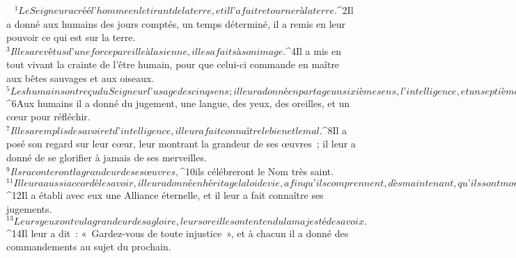          
      \bchapter{}
        ${}^{1}Le Seigneur a créé l’homme en le tirant de la terre,
        et il l’a fait retourner à la terre.
        ${}^{2}Il a donné aux humains des jours comptés, un temps déterminé,
        il a remis en leur pouvoir ce qui est sur la terre.
        ${}^{3}Il les a revêtus d’une force pareille à la sienne,
        il les a faits à son image.
        ${}^{4}Il a mis en tout vivant la crainte de l’être humain,
        pour que celui-ci commande en maître
        aux bêtes sauvages et aux oiseaux.
        ${}^{5}Les humains ont reçu du Seigneur l’usage des cinq sens ;
        il leur a donné en partage un sixième sens, l’intelligence,
        et un septième, la parole, qui permet d’interpréter ses œuvres.
        ${}^{6}Aux humains il a donné
        du jugement, une langue, des yeux,
        des oreilles, et un cœur pour réfléchir.
        ${}^{7}Il les a remplis de savoir et d’intelligence,
        il leur a fait connaître le bien et le mal.
        ${}^{8}Il a posé son regard sur leur cœur,
        leur montrant la grandeur de ses œuvres ;
        il leur a donné de se glorifier à jamais de ses merveilles.
        ${}^{9}Ils raconteront la grandeur de ses œuvres,
        ${}^{10}ils célébreront le Nom très saint.
        ${}^{11}Il leur a aussi accordé le savoir,
        il leur a donné en héritage la loi de vie,
        afin qu’ils comprennent, dès maintenant, qu’ils sont mortels.
        ${}^{12}Il a établi avec eux une Alliance éternelle,
        et il leur a fait connaître ses jugements.
        ${}^{13}Leurs yeux ont vu la grandeur de sa gloire,
        leurs oreilles ont entendu la majesté de sa voix.
        ${}^{14}Il leur a dit : « Gardez-vous de toute injustice »,
        et à chacun il a donné des commandements
        au sujet du prochain.
        
